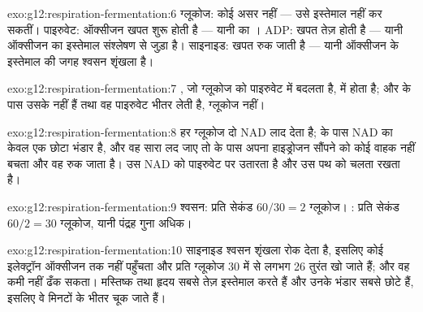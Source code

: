 \begin{solution}{exo:g12:respiration-fermentation:6}
ग्लूकोज: कोई असर नहीं ---  उसे इस्तेमाल नहीं कर सकतीं।
पाइरुवेट: ऑक्सीजन खपत शुरू होती है --- यानी  का । ADP:
खपत तेज़ होती है --- यानी ऑक्सीजन का इस्तेमाल  संश्लेषण से जुड़ा है।
साइनाइड: खपत रुक जाती है --- यानी ऑक्सीजन के इस्तेमाल की जगह श्वसन शृंखला है।
\end{solution}

\begin{solution}{exo:g12:respiration-fermentation:7}
, जो ग्लूकोज को पाइरुवेट में बदलता है,  में होता है;
और  के पास उसके  नहीं हैं तथा वह पाइरुवेट भीतर लेती है,
ग्लूकोज नहीं।
\end{solution}

\begin{solution}{exo:g12:respiration-fermentation:8}
हर ग्लूकोज दो NAD लाद देता है;  के पास NAD का केवल एक छोटा भंडार है,
और वह सारा लद जाए तो  के पास अपना हाइड्रोजन सौंपने को कोई वाहक
नहीं बचता और वह रुक जाता है।  उस NAD को पाइरुवेट पर उतारता है और उस
पथ को चलता रखता है।
\end{solution}

\begin{solution}{exo:g12:respiration-fermentation:9}
श्वसन: प्रति सेकंड $60/30 = 2$ ग्लूकोज। : प्रति सेकंड $60/2 = 30$
ग्लूकोज, यानी पंद्रह गुना अधिक।
\end{solution}

\begin{solution}{exo:g12:respiration-fermentation:10}
साइनाइड श्वसन शृंखला रोक देता है, इसलिए कोई इलेक्ट्रॉन ऑक्सीजन तक नहीं
पहुँचता और प्रति ग्लूकोज 30 में से लगभग 26  तुरंत खो जाते हैं; और 
वह कमी नहीं ढँक सकता। मस्तिष्क तथा हृदय  सबसे तेज़ इस्तेमाल करते हैं और
उनके भंडार सबसे छोटे हैं, इसलिए वे मिनटों के भीतर चूक जाते हैं।
\end{solution}

